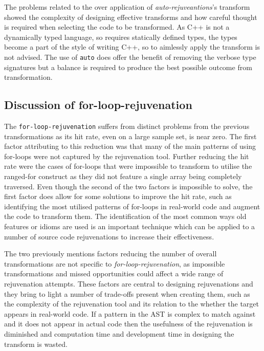 \documentclass[bsc,frontabs,singlespacing,twoside,parskip,deptreport]{infthesis}
\begin{document}
The problems related to the over application of \textit{auto-rejuveantions}'s transform showed the complexity of designing effective transforms and how careful thought is required when selecting the code to be transformed. As C++ is not a dynamically typed language, so requires statically defined types, the types become a part of the style of writing C++, so to aimlessly apply the transform is not advised. The use of \texttt{auto} does offer the benefit of removing the verbose type signatures but a balance is required to produce the best possible outcome from transformation. 

\subsection{Discussion of for-loop-rejuvenation}

The \texttt{for-loop-rejuvenation} suffers from distinct problems from the previous transformations as its hit rate, even on a large sample set, is near zero. The first factor attributing to this reduction was that many of the main patterns of using for-loops were not captured by the rejuvenation tool. Further reducing the hit rate were the cases of for-loops that were impossible to transform to utilise the ranged-for construct as they did not feature a single array being completely traversed. Even though the second of the two factors is impossible to solve, the first factor does allow for some solutions to improve the hit rate, such as identifying the most utilised patterns of for-loops in real-world code and augment the code to transform them. The identification of the most common ways old features or idioms are used is an important technique which can be applied to a number of source code rejuvenations to increase their effectiveness.

The two previously mentions factors reducing the number of overall transformations are not specific to \textit{for-loop-rejuvenation}, as impossible transformations and missed opportunities could affect a wide range of rejuvenation attempts. These factors are central to designing rejuvenations and they bring to light a number of trade-offs present when creating them, such as the complexity of the rejuvenation tool and its relation to the whether the target appears in real-world code. If a pattern in the AST is complex to match against and it does not appear in actual code then the usefulness of the rejuvenation is diminished and computation time and development time in designing the transform is wasted. 
\end{document}
